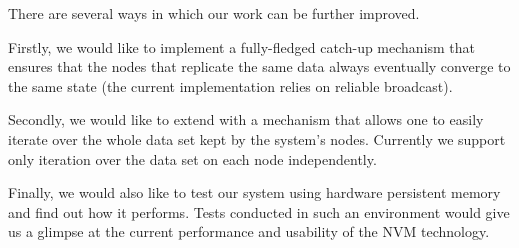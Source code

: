 There are several ways in which our work can be further improved.

Firstly, we would like to implement a fully-fledged catch-up mechanism that ensures that the nodes that replicate the same data always eventually converge to the same state (the current implementation relies on reliable broadcast).

Secondly, we would like to extend \DHTS with a mechanism that allows one to easily iterate over the whole data set kept by the system's nodes. Currently we support only iteration over the data set on each node independently.

Finally, we would also like to test our system using hardware persistent memory and find out how it performs. Tests conducted in such an environment would give us a glimpse at the current performance and usability of the NVM technology. 

\endinput